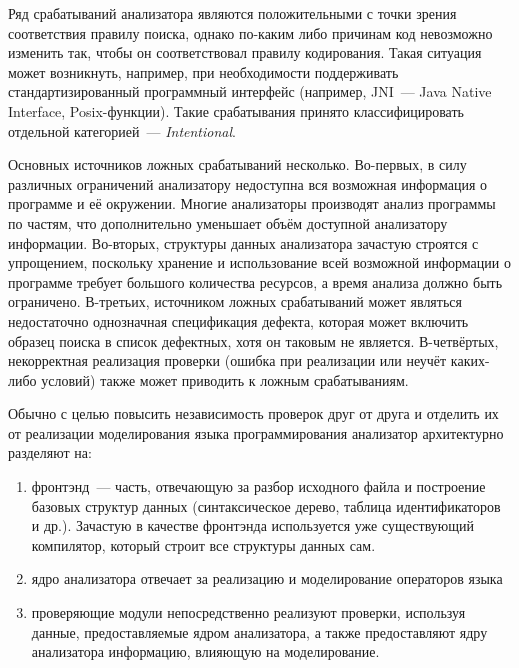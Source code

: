Ряд срабатываний анализатора являются положительными с точки зрения соответствия правилу поиска, однако по-каким либо причинам код невозможно изменить так, чтобы он соответствовал правилу кодирования. Такая ситуация может возникнуть, например, при необходимости поддерживать стандартизированный программный интерфейс (например, JNI~--- Java Native Interface, Posix-функции). Такие срабатывания принято классифицировать отдельной категорией~--- \textit{ Intentional}.

Основных источников ложных срабатываний несколько. Во-первых, в силу различных ограничений анализатору недоступна вся возможная информация о программе и её окружении. Многие анализаторы производят анализ программы по частям, что дополнительно уменьшает объём доступной анализатору информации. Во-вторых,  структуры данных анализатора зачастую строятся с упрощением, поскольку хранение и использование всей возможной информации о программе требует большого количества ресурсов, а время анализа должно быть ограничено. В-третьих, источником ложных срабатываний может являться недостаточно однозначная спецификация дефекта, которая может включить образец поиска в список дефектных, хотя он таковым не является. В-четвёртых, некорректная реализация проверки (ошибка при реализации или неучёт каких-либо условий) также может приводить к ложным срабатываниям.

Обычно с целью повысить независимость проверок друг от друга и отделить их от реализации моделирования языка программирования анализатор архитектурно разделяют на:

\begin{enumerate}
 \item фронтэнд~--- часть, отвечающую за разбор исходного файла и построение базовых структур данных (синтаксическое дерево, таблица идентификаторов и др.). Зачастую в качестве фронтэнда используется уже существующий компилятор, который строит все структуры данных сам.
 \item ядро анализатора отвечает за реализацию  и моделирование операторов языка
 \item проверяющие модули непосредственно реализуют проверки, используя данные, предоставляемые ядром анализатора, а также предоставляют ядру анализатора информацию, влияющую на моделирование.
\end{enumerate}



